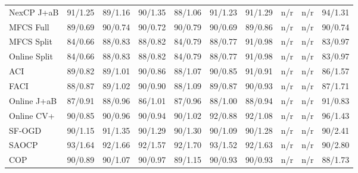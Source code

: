 \documentclass[11pt]{article}
\begin{document}
\begin{table}[h]
{\begin{tabular}{lrrrrrrrrr}
NexCP J+aB & 91/1.25 & 89/1.16 & 90/1.35 & 88/1.06 & 91/1.23 & 91/1.29 & n/r & n/r & 94/1.31\\
MFCS Full & 89/0.69 & 90/0.74 & 90/0.72 & 90/0.79 & 90/0.69 & 89/0.86 & n/r & n/r & 90/0.74\\
MFCS Split & \textcolor{red!70!black}{84/0.66} & 88/0.83 & 88/0.82 & \textcolor{red!70!black}{84/0.79} & 88/0.77 & 91/0.98 & n/r & n/r & \textcolor{red!70!black}{83/0.97}\\
Online Split & \textcolor{red!70!black}{84/0.66} & 88/0.83 & 88/0.82 & \textcolor{red!70!black}{84/0.79} & 88/0.77 & 91/0.98 & n/r & n/r & \textcolor{red!70!black}{83/0.97}\\
ACI & 89/0.82 & 89/1.01 & 90/0.86 & 88/1.07 & 90/0.85 & 91/0.91 & n/r & n/r & \textcolor{red!70!black}{86/1.57}\\
FACI & 88/0.87 & 89/1.02 & 90/0.90 & 88/1.09 & 89/0.87 & 90/0.93 & n/r & n/r & 87/1.71\\
Online J+aB & 87/0.91 & 88/0.96 & \textcolor{red!70!black}{86/1.01} & 87/0.96 & 88/1.00 & 88/0.94 & n/r & n/r & 91/0.83\\
Online CV+ & 90/0.85 & 90/0.96 & 90/0.94 & 90/1.02 & 92/0.88 & 92/1.08 & n/r & n/r & 96/1.43\\
SF-OGD & 90/1.15 & 91/1.35 & 90/1.29 & 90/1.30 & 90/1.09 & 90/1.28 & n/r & n/r & 90/2.41\\
SAOCP & 93/1.64 & 92/1.66 & 92/1.57 & 92/1.70 & 93/1.52 & 92/1.63 & n/r & n/r & 90/2.80\\
COP & 90/0.89 & 90/1.07 & 90/0.97 & 89/1.15 & 90/0.93 & 90/0.93 & n/r & n/r & 88/1.73\\
\bottomrule\end{tabular}}\end{table}
\end{document}
